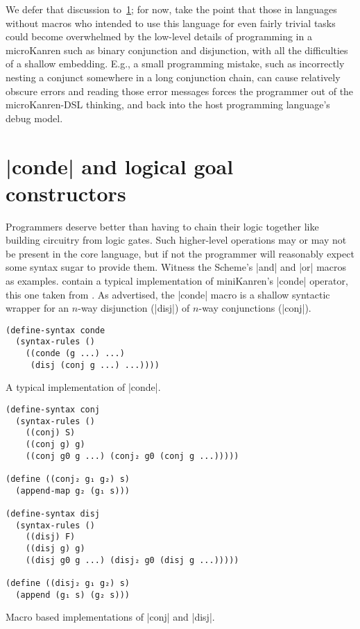 \documentclass[sigplan,screen,draft,anonymous,review,natbib=false]{acmart}
\begin{document}
We defer that discussion to~\cref{sec:conde}; for now, take the point
that those in languages without macros who intended to use this
language for even fairly trivial tasks could become overwhelmed by the
low-level details of programming in a microKanren such as binary
conjunction and disjunction, with all the difficulties of a shallow
embedding. E.g., a small programming mistake, such as incorrectly
nesting a conjunct somewhere in a long conjunction chain, can cause
relatively obscure errors and reading those error messages forces the
programmer out of the microKanren-DSL thinking, and back into the host
programming language's debug model.

\section{\rackinline|conde| and logical goal constructors}\label{sec:conde}

Programmers deserve better than having to chain their logic together
like building circuitry from logic gates. Such higher-level operations
may or may not be present in the core language, but if not the
programmer will reasonably expect some syntax sugar to provide them.
Witness the Scheme's \rackinline|and| and \rackinline|or| macros as
examples.
contain a typical implementation of miniKanren's \rackinline|conde|
operator, this one taken from . As
advertised, the \rackinline|conde| macro is a shallow syntactic
wrapper for an $n$-way disjunction (\rackinline|disj|) of $n$-way
conjunctions (\rackinline|conj|).

\begin{listing}
  \begin{verbatim}
(define-syntax conde
  (syntax-rules ()
    ((conde (g ...) ...)
     (disj (conj g ...) ...))))
  \end{verbatim}
\caption{A typical implementation of \rackinline|conde|.}
  \label{mnt:conde-implementation}
\end{listing}


\begin{listing}
  \begin{verbatim}
(define-syntax conj
  (syntax-rules ()
    ((conj) S)
    ((conj g) g)
    ((conj g0 g ...) (conj₂ g0 (conj g ...)))))

(define ((conj₂ g₁ g₂) s)
  (append-map g₂ (g₁ s)))

(define-syntax disj
  (syntax-rules ()
    ((disj) F)
    ((disj g) g)
    ((disj g0 g ...) (disj₂ g0 (disj g ...)))))

(define ((disj₂ g₁ g₂) s)
  (append (g₁ s) (g₂ s)))
  \end{verbatim}
  \caption{Macro based implementations of \rackinline|conj| and \rackinline|disj|.}
  \label{mnt:conj-and-disj-implementation}
\end{listing}
\end{document}
